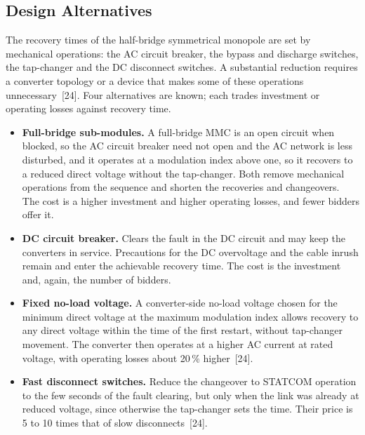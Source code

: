 \subsection{Design Alternatives}
\label{sec:dcf-alternatives}

The recovery times of the half-bridge symmetrical monopole are set by
mechanical operations: the AC circuit breaker, the bypass and discharge
switches, the tap-changer and the DC disconnect switches. A substantial
reduction requires a converter topology or a device that makes some of these
operations unnecessary~[24]. Four alternatives are known; each trades
investment or operating losses against recovery time.

\begin{itemize}[itemsep=0.2em]
  \item \textbf{Full-bridge sub-modules.} A full-bridge MMC is an open
        circuit when blocked, so the AC circuit breaker need not open and
        the AC network is less disturbed, and it operates at a modulation
        index above one, so it recovers to a reduced direct voltage without
        the tap-changer. Both remove mechanical operations from the sequence
        and shorten the recoveries and changeovers. The cost is a higher
        investment and higher operating losses, and fewer bidders offer it.
  \item \textbf{DC circuit breaker.} Clears the fault in the DC circuit and
        may keep the converters in service. Precautions for the DC
        overvoltage and the cable inrush remain and enter the achievable
        recovery time. The cost is the investment and, again, the number of
        bidders.
  \item \textbf{Fixed no-load voltage.} A converter-side no-load voltage
        chosen for the minimum direct voltage at the maximum modulation
        index allows recovery to any direct voltage within the time of the
        first restart, without tap-changer movement. The converter then
        operates at a higher AC current at rated voltage, with operating
        losses about 20\,\% higher~[24].
  \item \textbf{Fast disconnect switches.} Reduce the changeover to STATCOM
        operation to the few seconds of the fault clearing, but only when
        the link was already at reduced voltage, since otherwise the
        tap-changer sets the time. Their price is 5 to 10 times that of
        slow disconnects~[24].
\end{itemize}

\FloatBarrier
